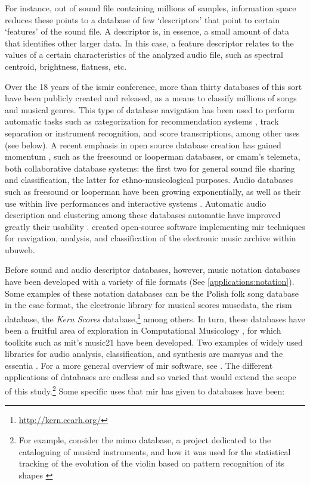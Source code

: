 \documentclass[
]{book}
\newcommand{\see}[1]{(See \ref{#1})}
\begin{document}
For instance, out of sound file containing millions of samples, information space reduces these points to a database of few `descriptors' that point to certain `features' of the sound file. A descriptor is, in essence, a small amount of data that identifies other larger data. In this case, a feature descriptor relates to the values of a certain characteristics of the analyzed audio file, such as spectral centroid, brightness, flatness, etc. 

Over the 18 years of the \gls{ismir} conference, more than thirty databases of this sort have been publicly created and released, as a means to classify millions of songs and musical genres. This type of database navigation has been used to perform automatic tasks such as categorization for recommendation systems \parencites{Tza02:Mus}{DBLP:journals/corr/abs-0812-4235}{asmita_poddar_2018_1422565}, track separation or instrument recognition, and score transcriptions, among other uses (see below). A recent emphasis in open source database creation has gained momentum \parencite{DBLP:conf/ismir/FonsecaPFFBFOPS17}, such as the \gls{freesound} or \gls{looperman} databases, or \gls{cmam}'s \gls{telemeta}, both collaborative database systems: the first two for general sound file sharing and classification, the latter for ethno-musicological purposes. Audio databases such as \gls{freesound} or \gls{looperman} have been growing exponentially, as well as their use within live performances and interactive systems \parencite{nuno_n_correia_2010_849729}. Automatic audio description and clustering among these databases automatic have improved greatly their usability \parencite{gerard_roma_2012_850102}. \textcite{collins_2015} created open-source software implementing \gls{mir} techniques for navigation, analysis, and classification of the electronic music archive within \gls{ubuweb}. 

Before sound and audio descriptor databases, however, music notation databases have been developed with a variety of file formats \see{applications:notation}. Some examples of these notation databases can be the Polish folk song database in the \gls{esac} format, the electronic library for musical scores \gls{musedata}, the \gls{rism} database, the \textit{Kern Scores} database,\footnote{\url{http://kern.ccarh.org/}} among others. In turn, these databases have been a fruitful area of exploration in Computational Musicology \parencite{DBLP:conf/iciso/Yokl11}, for which toolkits such as \gls{mit}'s \gls{music21} have been developed. Two examples of widely used libraries for audio analysis, classification, and synthesis are \gls{marsyas} \parencite{tzanetakis_cook_2000} and the \gls{essentia} \parencite{DBLP:conf/ismir/BogdanovWGGHMRSZS13}. For a more general overview of \gls{mir} software, see \parencite{DBLP:conf/ismir/BogdanovWGGHMRSZS13}. The different applications of databases are endless and so varied that would extend the scope of this study.\footnote{For example, consider the \gls{mimo} database, a project dedicated to the cataloguing of musical instruments, and how it was used for the statistical tracking of the evolution of the violin based on pattern recognition of its shapes \parencite{2018arXiv180802848P}} Some specific uses that \gls{mir} has given to databases have been:
\end{document}
